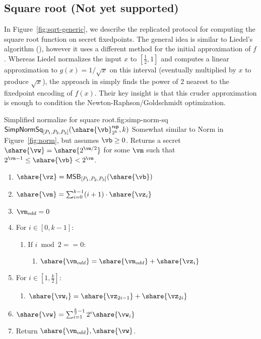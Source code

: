 \subsection{Square root (Not yet supported)}
\label{subsec:sqrt}

In Figure~\ref{fig:sqrt-generic}, we describe the replicated protocol for computing
the square root function on secret fixedpoints. The general idea is similar to
Liedel's algorithm (\cite{Liedel2012SecureDC}), however it uses a different method
for the initial approximation of $f$. Whereas Liedel normalizes the input $x$ to
$[\frac{1}{2}, 1]$ and computes a linear approximation to $g(x) = 1 / \sqrt{x}$ on
this interval (eventually multiplied by $x$ to produce $\sqrt{x}$), the approach in
\cite{cryptoeprint:2019:354} simply finds the power of 2 nearest to the fixedpoint
encoding of $f(x)$. Their key insight is that this cruder approximation is enough
to condition the Newton-Raphson/Goldschmidt optimization.

\begin{Boxfig}{Simplified normalize for square root.}{fig:simp-norm-sq}
  {$\mathsf{SimpNormSq}_{[P_1, P_2, P_3]}(\share{\vb}^\mathsf{rep}_{2^k}, k)$}
  Somewhat similar to Norm in Figure~\ref{fig:norm}, but assumes $\vb \geq 0$.
  Returns a secret $\share{\vw} = \share{2^{\vm/2}}$ for some $\vm$ such that
  $2^{\vm-1} \leq \share{\vb} < 2^\vm$.
  \begin{enumerate}
    \item $\share{\vz} = \mathsf{MSB}_{[P_1, P_2, P_3]} ( \share{\vb})$
    \item $\share{\vm} = \sum_{i=0}^{k-1}(i+1)\cdot\share{\vz_i}$
    \item $\vm_{odd} = 0$
    \item For $i \in [0, k-1]$:
    \begin{enumerate}
      \item If $i \bmod 2 == 0$:
      \begin{enumerate}
        \item $\share{\vm_{odd}} = \share{\vm_{odd}} + \share{\vz_i}$
      \end{enumerate}
    \end{enumerate}
    \item For $i \in [1, \frac{k}{2}]$:
    \begin{enumerate}
      \item $\share{\vw_i} = \share{\vz_{2i-1}} + \share{\vz_{2i}}$
    \end{enumerate}
    \item $\share{\vw} = \sum_{i=1}^{\frac{k}{2} - 1}2^i\share{\vw_i}$
    \item Return $\share{\vm_{odd}},\share{\vw}$.
  \end{enumerate}
\end{Boxfig}

